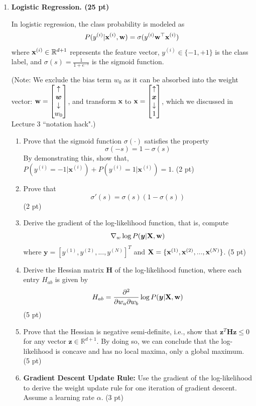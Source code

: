 \documentclass{article}
\theoremstyle{definition}
\theoremstyle{remark}
\newenvironment{Q}
        {%
          \clearpage
          \item
        }
        {%
          \phantom{s} %
          \bigskip
        }
\begin{document}
\begin{enumerate}[font={\Large\bfseries},left=0pt]
\begin{tcolorbox}
	\end{tcolorbox}
	\begin{Q}
		\textbf{\Large Logistic Regression. (25 pt)}

		In logistic regression, the class probability is modeled as
		$$P(y^{(i)}|{\bf{x}}^{(i)}, {\bf{w}}) = \sigma(y^{(i)} {\bf{w}}^\top {\bf{x}}^{(i)})$$
		where ${\bf{x}}^{(i)} \in \mathbb{R}^{d+1}$ represents the feature vector, $y^{(i)} \in \{-1,+1\}$ is the class label, and $\sigma(s) = \frac{1}{1 + e^{-s}}$ is the sigmoid function.

		(Note: We exclude the bias term $w_0$ as it can be absorbed into the weight vector: ${\bf w}=\begin{bmatrix}\uparrow \\\bm w\\\downarrow \\ w_0\end{bmatrix}$, and transform $\bm x$ to ${\bf x}=\begin{bmatrix}\uparrow \\\bm x\\\downarrow \\ 1\end{bmatrix}$, which we discussed in Lecture 3 ``notation hack".)


		\begin{enumerate}
			\item Prove that the sigmoid function $\sigma(\cdot)$ satisfies the property
			      $$\sigma(-s) = 1 - \sigma(s)$$
			      By demonstrating this, show that, $P(y^{(i)} = -1 | \bm{x}^{(i)}) + P(y^{(i)} = 1 | \bm{x}^{(i)}) = 1$. (2 pt)

			\item Prove that
			      $$\sigma'(s) = \sigma(s)(1 - \sigma(s))$$  (2 pt)

			\item Derive the gradient of the log-likelihood function, that is, compute
			      $$\nabla_w \log P(\bm{y} | {\bf{X}}, \bf{w})$$
			      where $\bm{y} = [y^{(1)}, y^{(2)}, ..., y^{(N)}]^T$ and ${\bf{X}} = \{{\bf{x}}^{(1)}, {\bf{x}}^{(2)}, ..., {\bf{x}}^{(N)}\}$. (5 pt)

			\item Derive the Hessian matrix $\bm{H}$ of the log-likelihood function, where each entry $H_{ab}$ is given by
			      $$H_{ab} = \frac{\partial^2}{\partial w_a \partial w_b} \log P(\bm{y} | {\bf{X}}, \bf{w})$$  (5 pt)

			\item Prove that the Hessian is negative semi-definite, i.e., show that $\bm{z}^T \bm{H} \bm{z} \leq 0$ for any vector $\bm{z} \in \mathbb{R}^{d+1}$. By doing so, we can conclude that the log-likelihood is concave and has no local maxima, only a global maximum.   (5 pt)
			\item \textbf{Gradient Descent Update Rule:} Use the gradient of the log-likelihood to derive the weight update rule for one iteration of gradient descent. Assume a learning rate $\alpha$.  (3 pt)


\end{enumerate}
\end{Q}
\end{enumerate}
\end{document}
